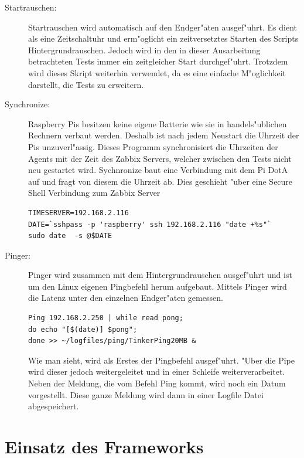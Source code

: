 \begin{enumerate}
\begin{description}
\item[Startrauschen:]Startrauschen wird automatisch auf den Endger"aten ausgef"uhrt. Es dient als eine Zeitschaltuhr %
und erm"oglicht ein zeitversetztes Starten des Scripts Hintergrundrauschen. %
Jedoch wird in den in dieser Ausarbeitung betrachteten Tests immer ein zeitgleicher Start %
durchgef"uhrt. Trotzdem wird dieses Skript weiterhin verwendet, da es eine einfache %
M"oglichkeit darstellt, die Tests zu erweitern. %

\item[Synchronize:]Raspberry Pis besitzen keine eigene Batterie wie sie in handels"ublichen Rechnern verbaut werden. %
Deshalb ist nach jedem Neustart die Uhrzeit der Pis unzuverl"assig. Dieses Programm synchronisiert %
die Uhrzeiten der Agents mit der Zeit des Zabbix Servers, welcher zwischen den Tests nicht neu gestartet wird. %
Sychnronize baut eine Verbindung mit dem Pi DotA auf und fragt von diesem die Uhrzeit ab. %
Dies geschieht "uber eine Secure Shell Verbindung zum Zabbix Server %
\begin{verbatim}
TIMESERVER=192.168.2.116
DATE=`sshpass -p 'raspberry' ssh 192.168.2.116 "date +%s"`
sudo date  -s @$DATE 
\end{verbatim}

\item[Pinger:]Pinger wird zusammen mit dem Hintergrundrauschen ausgef"uhrt und ist um den Linux eigenen Pingbefehl %
herum aufgebaut. Mittels Pinger wird die Latenz unter den einzelnen Endger"aten gemessen. %
\begin{verbatim}
Ping 192.168.2.250 | while read pong; 
do echo "[$(date)] $pong"; 
done >> ~/logfiles/ping/TinkerPing20MB &
\end{verbatim}
Wie man sieht, wird als Erstes der Pingbefehl ausgef"uhrt. "Uber die Pipe wird dieser jedoch weitergeleitet und in %
einer Schleife weiterverarbeitet. Neben der Meldung, die vom Befehl Ping kommt, wird noch ein Datum vorgestellt. %
Diese ganze Meldung wird dann in einer Logfile Datei abgespeichert. %
\end{description}
\end{enumerate}
\section{Einsatz des Frameworks} 

